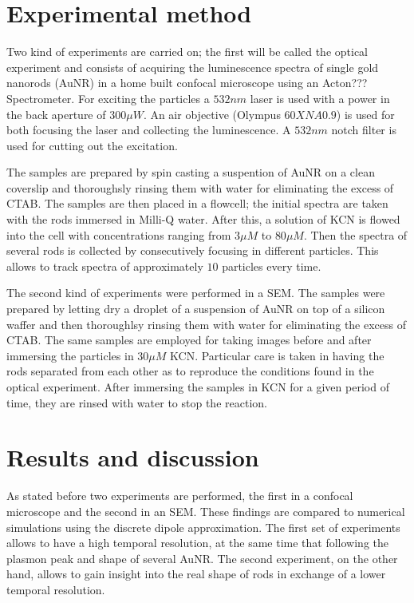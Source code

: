 \documentclass[twocolumn]{article}
\begin{document}
\section{Experimental method}
Two kind of experiments are carried on; the first will be called the optical
experiment and consists of acquiring the luminescence spectra of single gold
nanorods (AuNR) in a home built confocal microscope using an
Acton??? Spectrometer. For exciting the particles a $532nm$ laser is used with
a power in the back aperture of $300\mu W$. An air objective (Olympus
$60X NA 0.9$) is used for both focusing the laser and collecting the
luminescence. A $532nm$ notch filter is used for cutting out the excitation. 

The samples are prepared by spin casting a suspention of AuNR on a clean
coverslip and thoroughsly rinsing them  with water for eliminating the excess of
CTAB. The samples are then placed in a flowcell; the initial spectra are taken
with the rods immersed in Milli-Q water. After this, a solution of KCN is flowed
into the cell with concentrations ranging from $3\mu M$ to $80\mu M$. Then the
spectra of several rods is collected by consecutively focusing in different
particles. This allows to track spectra of approximately $10$ particles
every time.

The second kind of experiments were performed in a SEM. The samples
were prepared by letting dry a droplet of a suspension of AuNR on top of a
silicon waffer and then thoroughlsy rinsing them with water for eliminating the
excess of CTAB. The same samples are employed for taking images before and after
immersing the particles in $30\mu M$ KCN. Particular care is taken in having the
rods separated from each other as to reproduce the conditions found in the
optical experiment. After immersing the samples in KCN for a given period of
time, they are rinsed with water to stop the reaction.

\section{Results and discussion}
As stated before two experiments are performed, the first in a
confocal microscope and the second in an SEM. These findings are compared to
numerical simulations using the discrete dipole approximation. The first set of
experiments allows to have a high temporal resolution, at the same time that
following the plasmon peak and shape of several AuNR. The second experiment, on
the other hand, allows to gain insight into the real shape of rods in exchange
of a lower temporal resolution. 
\end{document}
